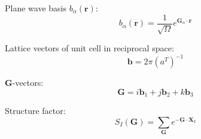 \documentclass[a4paper,11pt]{extarticle}
\begin{document}
Plane wave basis $b_{\alpha}(\mathbf{r})$:
\begin{equation}
b_{\alpha}(\mathbf{r}) = \frac{1}{\sqrt{\Omega}} e^{\mathbf{G}_{\alpha}\cdot\mathbf{r}}
\end{equation}

Lattice vectors of unit cell in reciprocal space:
\begin{equation}\label{eq:recvecs}
\mathbf{b} = 2\pi\left( a^{T} \right)^{-1}
\end{equation}

\textbf{G}-vectors:
\begin{equation}
\mathbf{G} = i \mathbf{b}_{1} + j \mathbf{b}_{2} + k \mathbf{b}_{3}
\end{equation}

Structure factor:
\begin{equation}
S_{I}(\mathbf{G}) = \sum_{\mathbf{G}} e^{ -\mathbf{G}\cdot\mathbf{X}_{I} }
\end{equation}
\end{document}
